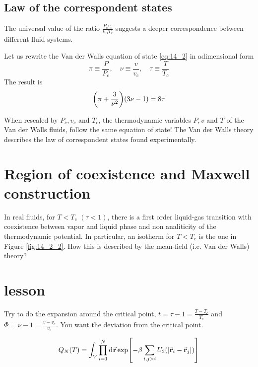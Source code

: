 \documentclass[../main/main.tex]{subfiles}
\begin{document}
\subsection{Law of the correspondent states}
The universal value of the ratio \( \frac{P_c v_c}{k_B T_c} \) suggests a deeper correspondence between different fluid systems.

Let us rewrite the Van der Walls equation of state \eqref{eq:14_2} in adimensional form
\begin{equation}
  \pi \equiv \frac{P}{P_c}, \quad \nu  \equiv \frac{v}{v_c}, \quad \tau \equiv \frac{T}{T_c}
\end{equation}
The result is
\begin{equation}
  \qty(\pi + \frac{3}{\nu ^2}) \qty(3 \nu -1) = 8 \tau
\end{equation}
\begin{remark}
When rescaled by \( P_c, v_c \) and \( T_c \), the thermodynamic variables \( P,v \) and \( T \) of the Van der Walls fluids, follow the same equation of state! The Van der Walls theory describes the law of correspondent states found experimentally.
\end{remark}

\section{Region of coexistence and Maxwell construction}
In real fluids, for \( T < T_c \) \( (\tau < 1) \), there is a first order liquid-gas transition with coexistence between vapor and liquid phase and non analiticity of the thermodynamic potential. In particular, an isotherm for \( T < T_c \) is the one in Figure \ref{fig:14_2_2}. How this is described by the mean-field (i.e. Van der Walls) theory?   




\section{lesson}


Try to do the expansion around the critical point, \( t = \tau -1 = \frac{T-T_c}{T_c}\) and \( \Phi = \nu -1 = \frac{v-v_c}{v_c} \). You want the deviation from the critical point.


\begin{equation}
  Q_N (T) = \int_{V}^{} \prod_{i=1}^{N}  \dd[]{\va{r}}  \exp [-\beta \sum_{i,j > i }^{}  U_2 ( \abs{\va{r}_i - \va{r}_j} ) ]
\end{equation}
\end{document}
